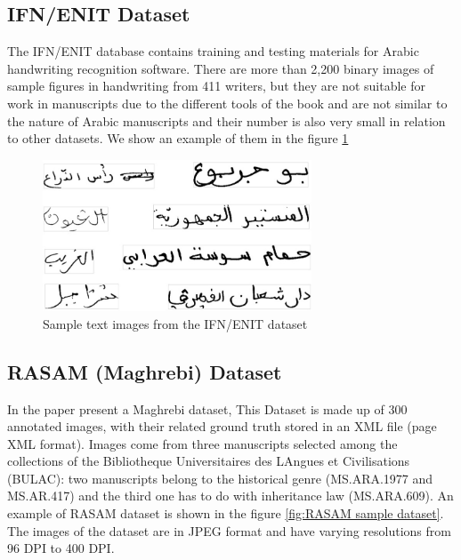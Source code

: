 \subsection{IFN/ENIT Dataset}
The IFN/ENIT \cite{IFNENIT} database contains training and testing materials for Arabic handwriting recognition software. There are more than 2,200 binary images of sample figures in handwriting from 411 writers\cite{ali2019efficient}, but they are not suitable for work in manuscripts due to the different tools of the book and are not similar to the nature of Arabic manuscripts and their number is also very small in relation to other datasets. We show an example of them in the figure \ref{fig:Sample text images from the IFN/ENIT dataset}

\begin{figure}[!htb]
    \centering
    \includegraphics[width=8cm]{images/Sample-text-images-from-the-IFN-ENIT-database.png}
    \caption{Sample text images from the IFN/ENIT dataset}
    \label{fig:Sample text images from the IFN/ENIT dataset}
\end{figure}

\subsection{RASAM (Maghrebi) Dataset}
In the paper \cite{RASAM} present a Maghrebi dataset, This Dataset is made up of 300 annotated images, with their related ground truth stored in an XML file (page XML format). Images come from three manuscripts selected among the collections of the Bibliotheque Universitaires des LAngues et Civilisations (BULAC): two manuscripts belong to the historical genre (MS.ARA.1977 and MS.AR.417) and the third one has to do with inheritance law (MS.ARA.609). An example of RASAM dataset is shown in the figure \ref{fig:RASAM sample dataset}. The images of the dataset are in JPEG format and have varying resolutions from 96 DPI to 400 DPI.

